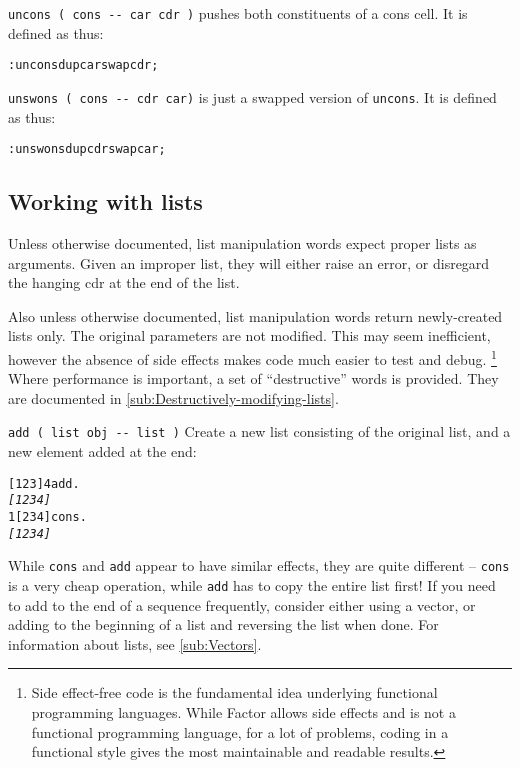\documentclass[english]{article}
\begin{document}
\texttt{uncons ( cons -{}- car cdr )} pushes both constituents of a cons cell. It is defined as thus:

\begin{alltt}
: uncons dup car swap cdr ;
\end{alltt}

\texttt{unswons ( cons -{}- cdr car)} is just a swapped version of \texttt{uncons}. It is defined as thus:

\begin{alltt}
: unswons dup cdr swap car ;
\end{alltt}

\subsection{Working with lists}

Unless otherwise documented, list manipulation words expect proper
lists as arguments. Given an improper list, they will either raise
an error, or disregard the hanging cdr at the end of the list.

Also unless otherwise documented, list manipulation words return newly-created
lists only. The original parameters are not modified. This may seem
inefficient, however the absence of side effects makes code much easier
to test and debug.%
\footnote{Side effect-free code is the fundamental idea underlying functional
programming languages. While Factor allows side effects and is not
a functional programming language, for a lot of problems, coding in
a functional style gives the most maintainable and readable results.%
} Where performance is important, a set of {}``destructive'' words
is provided. They are documented in \ref{sub:Destructively-modifying-lists}.

\texttt{add ( list obj -{}- list )} Create a new list consisting of
the original list, and a new element added at the end:

\begin{alltt}
{[} 1 2 3 {]} 4 add .
\emph{{[} 1 2 3 4 {]}}
1 {[} 2 3 4 {]} cons .
\emph{{[} 1 2 3 4 {]}}
\end{alltt}
While \texttt{cons} and \texttt{add} appear to have similar effects,
they are quite different -- \texttt{cons} is a very cheap operation,
while \texttt{add} has to copy the entire list first! If you need to add to the end of a sequence frequently, consider either using a vector, or adding to the beginning of a list and reversing the list when done. For information about lists, see \ref{sub:Vectors}.
\end{document}
